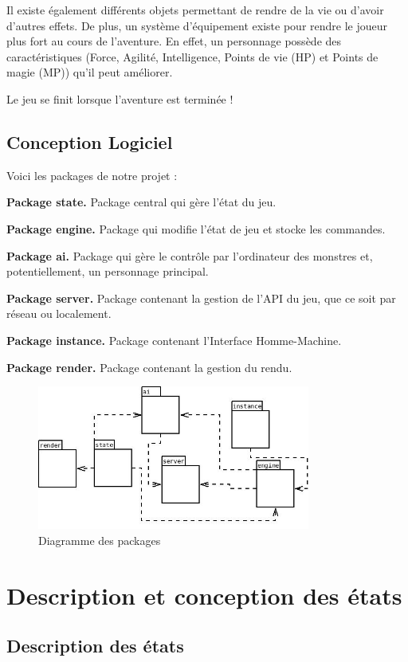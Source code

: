 \documentclass[12pt,a4paper]{report}
\begin{document}
Il existe \'{e}galement diff\'{e}rents objets permettant de rendre de la vie ou d'avoir d'autres effets. De plus, un système d'\'{e}quipement existe pour rendre le joueur plus fort au cours de l'aventure. En effet, un personnage possède des caract\'{e}ristiques (Force, Agilit\'{e}, Intelligence, Points de vie (HP) et Points de magie (MP)) qu'il peut am\'{e}liorer.

Le jeu se finit lorsque l'aventure est termin\'{e}e !
\section{Conception Logiciel}

Voici les packages de notre projet :

\textbf{Package state.} Package central qui gère l'\'{e}tat du jeu.

\textbf{Package engine.} Package qui modifie l'\'{e}tat de jeu et stocke les commandes.

\textbf{Package ai.} Package qui gère le contrôle par l'ordinateur des monstres et, potentiellement, un personnage principal.

\textbf{Package server.} Package contenant la gestion de l'API du jeu, que ce soit par r\'{e}seau ou localement.

\textbf{Package instance.} Package contenant l'Interface Homme-Machine.

\textbf{Package render.} Package contenant la gestion du rendu.

\begin{figure}
\caption{Diagramme des packages}
\includegraphics[width=0.80\textwidth]{packdia.jpeg}
\end{figure}

\chapter{Description et conception des \'{e}tats}
\section{Description des \'{e}tats}
\end{document}

